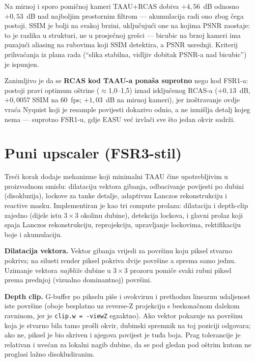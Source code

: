 \documentclass{mathos}
\begin{document}
Na mirnoj i sporo pomičnoj kameri TAAU+RCAS dobiva $+4,56$~dB odnosno
$+0,53$~dB nad najboljim prostornim filtrom — akumulacija radi ono zbog čega
postoji. SSIM je bolji na svakoj brzini, uključujući one na kojima PSNR
zaostaje: to je razlika u strukturi, ne u prosječnoj grešci — bicubic na
brzoj kameri ima puzajući aliasing na rubovima koji SSIM detektira, a PSNR
usrednji. Kriterij prihvaćanja iz plana rada (``slika stabilna, vidljiv
dobitak PSNR-a nad bicubic'') je ispunjen.

Zanimljivo je da se \textbf{RCAS kod TAAU-a ponaša suprotno} nego kod FSR1-a:
postoji pravi optimum oštrine ($\approx$1,0--1,5) iznad isključenog RCAS-a
($+0,13$~dB, $+0,0057$ SSIM na 60~fps; $+1,03$~dB na mirnoj kameri), jer
izoštravanje ovdje vraća Nyquist koji je resample povijesti dokazivo odnio, a
ne izmišlja detalj kojeg nema — suprotno FSR1-u, gdje EASU već izvlači sve
što jedan okvir sadrži.

\section{Puni upscaler (FSR3-stil)}\label{fsr_full}

Treći korak dodaje mehanizme koji minimalni TAAU čine upotrebljivim u
proizvodnom smislu: dilataciju vektora gibanja, odbacivanje povijesti po
dubini (disokluzija), lockove za tanke detalje, adaptivnu Lanczos
rekonstrukciju i reactive masku. Implementiran je kao tri compute prolaza:
dilatacija i depth-clip zajedno (dijele istu $3\times3$ okolinu dubine),
detekcija lockova, i glavni prolaz koji spaja Lanczos rekonstrukciju,
reprojekciju, upravljanje lockovima, rektifikaciju boje i akumulaciju.

\textbf{Dilatacija vektora.} Vektor gibanja vrijedi za površinu koju piksel
stvarno pokriva; na silueti render piksel pokriva dvije površine a sprema
samo jednu. Uzimanje vektora \emph{najbliže} dubine u $3\times3$ prozoru
pomiče svaki rubni piksel prema prednjoj (vizualno dominantnoj) površini.

\textbf{Depth clip.} G-buffer po pikselu piše i ovokvirnu i prethodnu
linearnu udaljenost iste površine (oboje besplatno uz reverse-Z projekciju s
beskonačnom dalekom ravninom, jer je \verb+clip.w = -viewZ+ egzaktno). Ako
vektor pokazuje na površinu koja je stvarno bila tamo prošli okvir, dubinski
spremnik na toj poziciji odgovara; ako ne, piksel je bio skriven i njegova
povijest je tuđa boja. Prag tolerancije je relativan i uvećan za lokalni
nagib dubine, da se pod gledan pod oštrim kutom ne proglasi lažno
disokludiranim.
\end{document}
